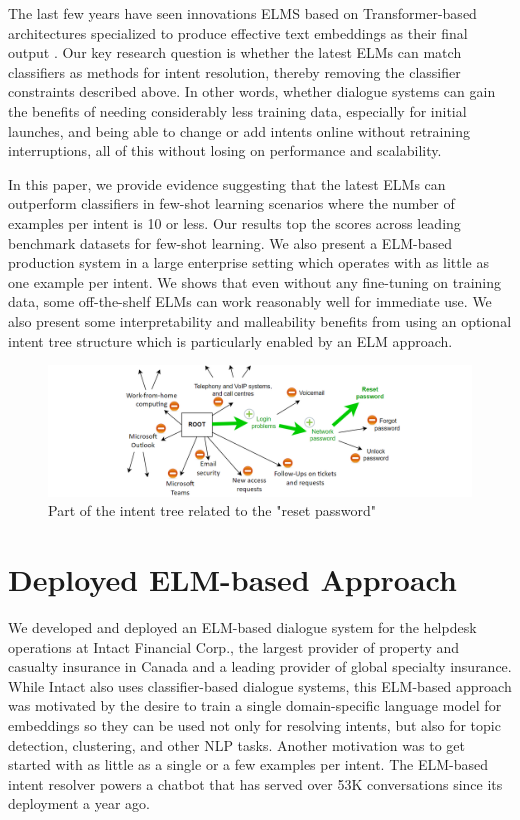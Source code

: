 \documentclass[sigconf, anonymous=true]{acmart}
\begin{document}
The last few years have seen innovations ELMS based on Transformer-based architectures specialized to produce effective text embeddings as their final output \citep{cer2018universal, reimers-2019-sentence-bert, gao2021simcse}. Our key research question is whether the latest ELMs can match classifiers as methods for intent resolution, thereby removing the classifier constraints described above. In other words, whether dialogue systems can gain the benefits of needing considerably less training data, especially for initial launches, and being able to change or add intents online without retraining interruptions, all of this without losing on performance and scalability. 

In this paper, we provide evidence suggesting that the latest ELMs can outperform classifiers in few-shot learning scenarios where the number of examples per intent is 10 or less. Our results top the scores across leading benchmark datasets for few-shot learning. We also present a ELM-based production system in a large enterprise setting which operates with as little as one example per intent. We shows that even without any fine-tuning on training data, some off-the-shelf ELMs can work reasonably well for immediate use. We also present some interpretability and malleability benefits from using an optional intent tree structure which is particularly enabled by an ELM approach. 


\begin{figure}[ht]
  \includegraphics[width=\columnwidth]{pic/figure1.PNG}
  \caption{Part of the intent tree related to the "reset password"}
\end{figure}


\section{Deployed ELM-based Approach}
We developed and deployed an ELM-based dialogue system for the helpdesk operations at Intact Financial Corp., the largest provider of property and casualty insurance in Canada and a leading provider of global specialty insurance. While Intact also uses classifier-based dialogue systems, this ELM-based approach was motivated by the desire to train a single domain-specific language model for embeddings so they can be used not only for resolving intents, but also for topic detection, clustering, and other NLP tasks. Another motivation was to get started with as little as a single or a few examples per intent. The ELM-based intent resolver powers a chatbot that has served over 53K conversations since its deployment a year ago.
\end{document}
